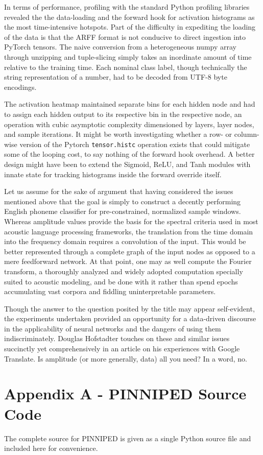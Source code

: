 \documentclass[10pt,epsf]{article}
\begin{document}
{  In terms of performance, profiling with the standard Python profiling libraries revealed the
  the data-loading and the forward hook for activation histograms as the most time-intensive hotspots.
  Part of the difficulty in expediting the loading of the data is that the ARFF format is not
  conducive to direct ingestion into PyTorch tensors. The naive conversion from a
  heterogeneous numpy array through unzipping and tuple-slicing simply takes an inordinate
  amount of time relative to the training time. Each nominal class label, though technically
  the string representation of a number, had to be decoded from UTF-8 byte encodings.

  The activation heatmap maintained separate bins for each hidden node and had to assign
  each hidden output to its respective bin in the respective node, an operation with cubic
  asymptotic complexity dimensioned by layers, layer nodes, and sample iterations. It might be
  worth investigating whether a row- or column-wise version of the Pytorch \texttt{tensor.histc}
  operation exists that could mitigate some of the looping cost, to say nothing of the forward hook
  overhead. A better design might have been to extend the Sigmoid, ReLU, and Tanh modules with
  innate state for tracking histograms inside the forward override itself.

  Let us assume for the sake of argument that having considered the issues mentioned above that
  the goal is simply to construct a decently performing English phoneme classifier for pre-constrained,
  normalized sample windows. Whereas amplitude values provide the basis for the spectral
  criteria used in most acoustic language processing frameworks, the translation from the time domain
  into the frequency domain requires a convolution of the input. This would be better represented
  through a complete graph of the input nodes as opposed to a mere feedforward network.
  At that point, one may as well compute the Fourier transform, a thoroughly analyzed
  and widely adopted computation specially suited to acoustic modeling, and be done with it rather
  than spend epochs accumulating vast corpora and fiddling uninterpretable parameters.

  Though the answer to the question posited by the title may appear self-evident, the experiments
  undertaken provided an opportunity for a data-driven discourse in the applicability of neural
  networks and the dangers of using them indiscriminately. Douglas Hofstadter touches on these
  and similar issues succinctly yet comprehensively in an article on his experiences with
  Google Translate\autocite{ggltrans}. Is amplitude (or more generally, data) all you need? In a word, no.
}

\printbibliography
\section{Appendix A - PINNIPED Source Code}{
  The complete source for PINNIPED is given as a single Python source file and included here
  for convenience.
  {\scriptsize\inputminted{python}{./pinniped.py}}
}
\end{document}

